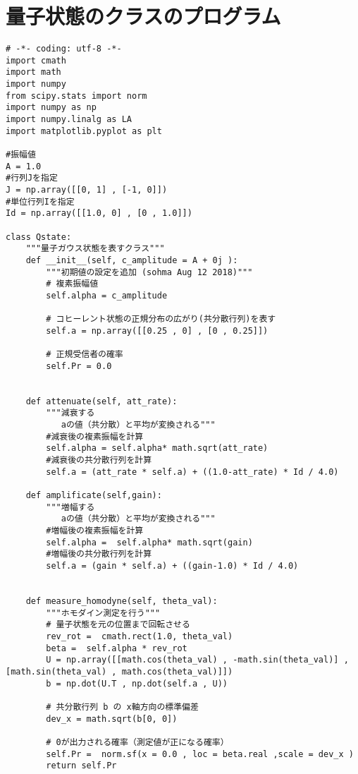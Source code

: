 \renewcommand{\prechaptername}{付録}
\renewcommand{\postchaptername}{}
\renewcommand{\thechapter}{\Alph{chapter}}
\setcounter{chapter}{0}

\chapter{量子状態のクラスのプログラム}
\begin{lstlisting}[caption=量子状態のクラス,label=Qstate]
# -*- coding: utf-8 -*-
import cmath
import math
import numpy
from scipy.stats import norm
import numpy as np
import numpy.linalg as LA
import matplotlib.pyplot as plt

#振幅値 
A = 1.0
#行列Jを指定
J = np.array([[0, 1] , [-1, 0]])
#単位行列Iを指定
Id = np.array([[1.0, 0] , [0 , 1.0]])  

class Qstate:
    """量子ガウス状態を表すクラス"""
    def __init__(self, c_amplitude = A + 0j ):
        """初期値の設定を追加 (sohma Aug 12 2018)"""
        # 複素振幅値
        self.alpha = c_amplitude

        # コヒーレント状態の正規分布の広がり(共分散行列)を表す        
        self.a = np.array([[0.25 , 0] , [0 , 0.25]])

        # 正規受信者の確率        
        self.Pr = 0.0
        
        
    def attenuate(self, att_rate):
        """減衰する
           aの値（共分散）と平均が変換される"""
        #減衰後の複素振幅を計算
        self.alpha = self.alpha* math.sqrt(att_rate)
        #減衰後の共分散行列を計算
        self.a = (att_rate * self.a) + ((1.0-att_rate) * Id / 4.0)

    def amplificate(self,gain):
        """増幅する
           aの値（共分散）と平均が変換される"""
        #増幅後の複素振幅を計算
        self.alpha =  self.alpha* math.sqrt(gain)
        #増幅後の共分散行列を計算
        self.a = (gain * self.a) + ((gain-1.0) * Id / 4.0)


    def measure_homodyne(self, theta_val):
        """ホモダイン測定を行う"""     
        # 量子状態を元の位置まで回転させる
        rev_rot =  cmath.rect(1.0, theta_val)
        beta =  self.alpha * rev_rot
        U = np.array([[math.cos(theta_val) , -math.sin(theta_val)] , [math.sin(theta_val) , math.cos(theta_val)]])
        b = np.dot(U.T , np.dot(self.a , U))
        
        # 共分散行列 b の x軸方向の標準偏差
        dev_x = math.sqrt(b[0, 0])
        
        # 0が出力される確率（測定値が正になる確率）       
        self.Pr =  norm.sf(x = 0.0 , loc = beta.real ,scale = dev_x )
        return self.Pr
    

\end{lstlisting}
